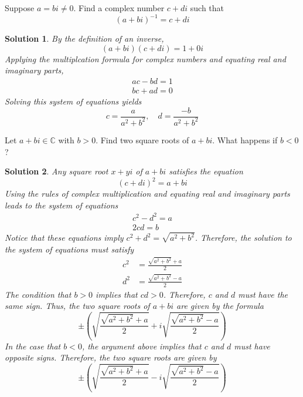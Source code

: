 \documentclass{book}
\newcommand{\complex}{\mathbb{C}}
\newtheorem*{soln}{Solution}
\theoremstyle{definition}
\begin{document}
\begin{problem}
    Suppose $a=bi\neq0$. Find a complex number $c+di$ such that 
    \[
        (a+bi)^{-1} = c+di
    \]
\end{problem}

\begin{soln}
    By the definition of an inverse,
    \[
        (a+bi)(c+di) = 1+0i
    \]
    Applying the multiplcation formula for complex numbers and equating real and
    imaginary parts,
    \begin{gather*}
        ac-bd=1 \\ bc+ad = 0
    \end{gather*}
    Solving this system of equations yields
    \begin{equation*}
        c = \frac{a}{a^2+b^2},\quad d = \frac{-b}{a^2+b^2} 
    \end{equation*}
\end{soln}

\begin{problem}
    Let $a+bi\in\complex$ with $b>0$. Find two square roots of $a+bi$. What 
    happens if $b<0$?
\end{problem}

\begin{soln}
    Any square root $x+yi$ of $a+bi$ satisfies the equation
    \[
        (c+di)^2 = a+bi
    \]
    Using the rules of complex multiplication and equating real and imaginary
    parts leads to the system of equations
    \begin{gather*}
        c^2-d^2=a \\ 2cd=b
    \end{gather*}
    Notice that these equations imply $c^2+d^2=\sqrt{a^2+b^2}$. Therefore, the 
    solution to the system of equations must satisfy
    \begin{align*}
        c^2 &= \frac{\sqrt{a^2+b^2}+a}{2} \\
        d^2 &= \frac{\sqrt{a^2+b^2}-a}{2}
    \end{align*}
    The condition that $b>0$ implies that $cd>0$. Therefore, $c$ and $d$ must 
    have the same sign. Thus, the two square roots of $a+bi$ are given by the
    formula 
    \[
        \pm\left(\sqrt{\frac{\sqrt{a^2+b^2}+a}{2}} + 
        i\sqrt{\frac{\sqrt{a^2+b^2}-a}{2}}\right)
    \]
    In the case that $b<0$, the argument above implies that $c$ and $d$ must
    have opposite signs. Therefore, the two square roots are given by
    \[
        \pm\left(\sqrt{\frac{\sqrt{a^2+b^2}+a}{2}} - 
        i\sqrt{\frac{\sqrt{a^2+b^2}-a}{2}}\right)
    \]
\end{soln}
\break
\end{document}
